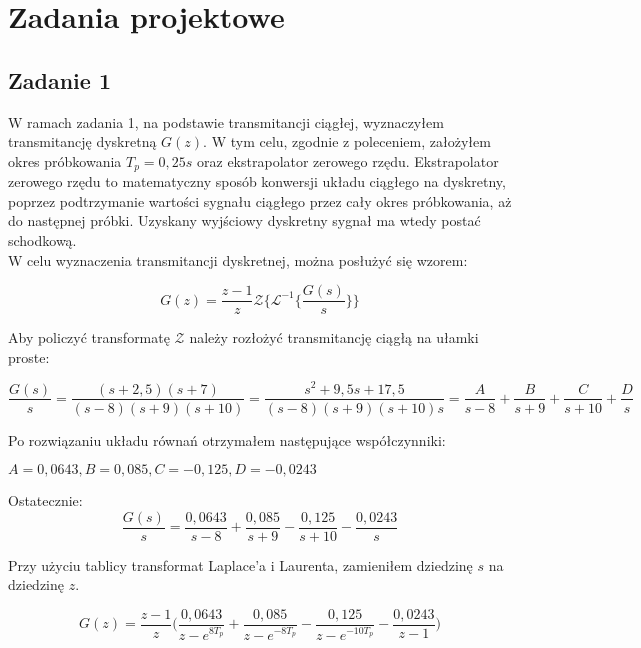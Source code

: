 \documentclass[a4paper,titlepage,11pt,floatssmall]{mwrep}
\begin{document}
\chapter{Zadania projektowe}

\section{Zadanie 1}
W ramach zadania 1, na podstawie transmitancji ciągłej, wyznaczyłem transmitancję dyskretną $G(z)$. W tym celu, zgodnie z poleceniem, założyłem okres próbkowania $T_p = 0,25s$ oraz ekstrapolator zerowego rzędu. Ekstrapolator zerowego rzędu to matematyczny sposób konwersji układu ciągłego na dyskretny, poprzez podtrzymanie wartości sygnału ciągłego przez cały okres próbkowania, aż do następnej próbki. Uzyskany wyjściowy dyskretny sygnał ma wtedy postać schodkową. \\
\indent{} W celu wyznaczenia transmitancji dyskretnej, można posłużyć się wzorem:

\begin{equation*}
G(z) = \frac{z-1}{z} \mathcal{Z} \bigg\{ \mathcal{L}^{-1} \bigg\{ \frac{G(s)}{s} \bigg\} \bigg\}  
\end{equation*}

Aby policzyć transformatę $\mathcal{Z}$ należy rozłożyć transmitancję ciągłą na ułamki proste:

\begin{equation*}
\frac{G(s)}{s} =  \frac{(s + 2,5)(s + 7)}{(s - 8)(s + 9)(s + 10)}  = \frac{s^2 + 9,5s + 17,5}{(s - 8)(s + 9)(s + 10)s} = \frac{A}{s-8} + 
\frac{B}{s+9} + \frac{C}{s+10} + \frac{D}{s} 
\end{equation*}

Po rozwiązaniu układu równań otrzymałem następujące współczynniki:
\begin{center}$A = 0,0643, B = 0,085, C = -0,125,  D = -0,0243 $\end{center}

Ostatecznie:
\begin{equation*}
\frac{G(s)}{s} = \frac{0,0643}{s-8} + 
\frac{0,085}{s+9} - \frac{0,125}{s+10} - \frac{0,0243}{s} 
\end{equation*}

Przy użyciu tablicy transformat Laplace'a i Laurenta, zamieniłem dziedzinę $s$ na dziedzinę $z$. 

\begin{equation*}
G(z) = \frac{z-1}{z}\bigg( \frac{0,0643}{z - e^{8 T_p}} + 
\frac{0,085}{z - e^{-8 T_p}} - \frac{0,125}{z - e^{-10 T_p}} - \frac{0,0243}{z - 1} \bigg) 
\end{equation*}
\end{document}
